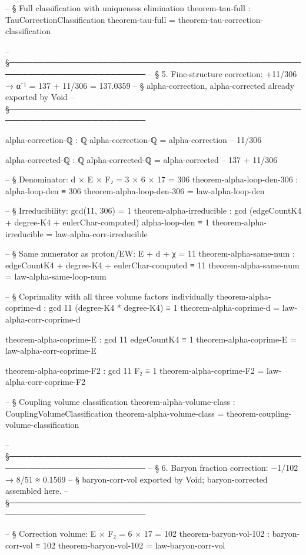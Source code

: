 \documentclass[11pt,a4paper]{book}
\begin{document}
\begin{code}
-- § Full classification with uniqueness elimination
theorem-tau-full : TauCorrectionClassification
theorem-tau-full = theorem-tau-correction-classification

-- §──────────────────────────────────────────────────────────────────────────
-- § 5. Fine-structure correction: +11/306 → α⁻¹ = 137 + 11/306 = 137.0359̄
-- §    alpha-correction, alpha-corrected already exported by Void
-- §──────────────────────────────────────────────────────────────────────────

alpha-correction-ℚ : ℚ
alpha-correction-ℚ = alpha-correction     -- 11/306

alpha-corrected-ℚ : ℚ
alpha-corrected-ℚ = alpha-corrected       -- 137 + 11/306

-- § Denominator: d × E × F₂ = 3 × 6 × 17 = 306
theorem-alpha-loop-den-306 : alpha-loop-den ≡ 306
theorem-alpha-loop-den-306 = law-alpha-loop-den

-- § Irreducibility: gcd(11, 306) = 1
theorem-alpha-irreducible : gcd (edgeCountK4 + degree-K4 + eulerChar-computed) alpha-loop-den ≡ 1
theorem-alpha-irreducible = law-alpha-corr-irreducible

-- § Same numerator as proton/EW: E + d + χ = 11
theorem-alpha-same-num : edgeCountK4 + degree-K4 + eulerChar-computed ≡ 11
theorem-alpha-same-num = law-alpha-same-loop-num

-- § Coprimality with all three volume factors individually
theorem-alpha-coprime-d : gcd 11 (degree-K4 * degree-K4) ≡ 1
theorem-alpha-coprime-d = law-alpha-corr-coprime-d

theorem-alpha-coprime-E : gcd 11 edgeCountK4 ≡ 1
theorem-alpha-coprime-E = law-alpha-corr-coprime-E

theorem-alpha-coprime-F2 : gcd 11 F₂ ≡ 1
theorem-alpha-coprime-F2 = law-alpha-corr-coprime-F2

-- § Coupling volume classification
theorem-alpha-volume-class : CouplingVolumeClassification
theorem-alpha-volume-class = theorem-coupling-volume-classification

-- §──────────────────────────────────────────────────────────────────────────
-- § 6. Baryon fraction correction: −1/102 → 8/51 ≈ 0.1569
-- §    baryon-corr-vol exported by Void; baryon-corrected assembled here.
-- §──────────────────────────────────────────────────────────────────────────

-- § Correction volume: E × F₂ = 6 × 17 = 102
theorem-baryon-vol-102 : baryon-corr-vol ≡ 102
theorem-baryon-vol-102 = law-baryon-corr-vol


\end{code}
\end{document}
